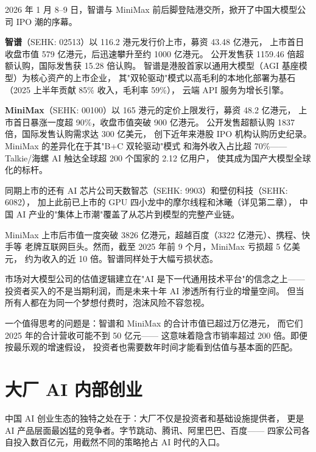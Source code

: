 2026 年 1 月 8--9 日，智谱与 MiniMax 前后脚登陆港交所，掀开了中国大模型公司
IPO 潮的序幕。

\textbf{智谱}（SEHK: 02513）以 116.2 港元发行价上市，募资 43.48 亿港元，
上市首日收盘市值 579 亿港元，后迅速攀升至约 1000 亿港元。
公开发售获 1159.46 倍超额认购，国际发售获 15.28 倍认购。
智谱是港股首家以通用大模型（AGI 基座模型）为核心资产的上市企业，
其"双轮驱动"模式以高毛利的本地化部署为基石（2025 上半年贡献 85\% 收入，毛利率 59\%），
云端 API 服务为增长引擎。

\textbf{MiniMax}（SEHK: 00100）以 165 港元的定价上限发行，募资 48.2 亿港元，
上市首日暴涨一度超 90\%，收盘市值突破 900 亿港元。
公开发售超额认购 1837 倍，国际发售认购需求达 300 亿美元，
创下近年来港股 IPO 机构认购历史纪录。MiniMax 的差异化在于其"B+C 双轮驱动"模式
和海外收入占比超 70\%——Talkie/海螺 AI 触达全球超 200 个国家的 2.12 亿用户，
使其成为国产大模型全球化的标杆。

同期上市的还有 AI 芯片公司天数智芯（SEHK: 9903）和壁仞科技（SEHK: 6082），
加上此前已上市的 GPU 四小龙中的摩尔线程和沐曦（详见第二章），
中国 AI 产业的"集体上市潮"覆盖了从芯片到模型的完整产业链。

\begin{warnbox}
MiniMax 上市后市值一度突破 3826 亿港元，超越百度（3322 亿港元）、携程、快手等
老牌互联网巨头。然而，截至 2025 年前 9 个月，MiniMax 亏损超 5 亿美元，
约为收入的近 10 倍。智谱同样处于大幅亏损状态。

市场对大模型公司的估值逻辑建立在"AI 是下一代通用技术平台"的信念之上——
投资者买入的不是当期利润，而是未来十年 AI 渗透所有行业的增量空间。
但当所有人都在为同一个梦想付费时，泡沫风险不容忽视。

一个值得思考的问题是：智谱和 MiniMax 的合计市值已超过万亿港元，
而它们 2025 年的合计营收可能不到 50 亿元——
这意味着隐含市销率超过 200 倍。即便按最乐观的增速假设，
投资者也需要数年时间才能看到估值与基本面的匹配。
\end{warnbox}



\section{大厂 AI 内部创业}
\label{sec:china-bigtech}

中国 AI 创业生态的独特之处在于：大厂不仅是投资者和基础设施提供者，
更是 AI 产品层面最凶猛的竞争者。字节跳动、腾讯、阿里巴巴、百度——
四家公司各自投入数百亿元，用截然不同的策略抢占 AI 时代的入口。

